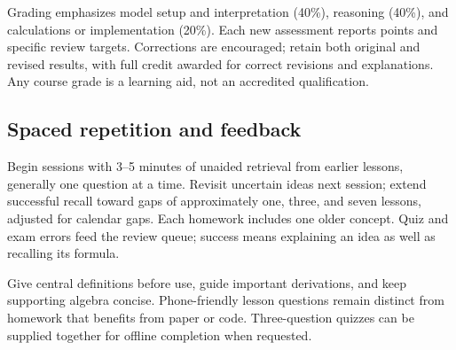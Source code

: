 \documentclass[11pt]{article}
\theoremstyle{remark}\newtheorem{remark}[definition]{Remark}
\begin{document}
Grading emphasizes model setup and interpretation (40\%), reasoning (40\%), and calculations or implementation (20\%). Each new assessment reports points and specific review targets. Corrections are encouraged; retain both original and revised results, with full credit awarded for correct revisions and explanations. Any course grade is a learning aid, not an accredited qualification.

\subsection*{Spaced repetition and feedback}
Begin sessions with 3--5 minutes of unaided retrieval from earlier lessons, generally one question at a time. Revisit uncertain ideas next session; extend successful recall toward gaps of approximately one, three, and seven lessons, adjusted for calendar gaps. Each homework includes one older concept. Quiz and exam errors feed the review queue; success means explaining an idea as well as recalling its formula.

Give central definitions before use, guide important derivations, and keep supporting algebra concise. Phone-friendly lesson questions remain distinct from homework that benefits from paper or code. Three-question quizzes can be supplied together for offline completion when requested.

\clearpage
\end{document}
